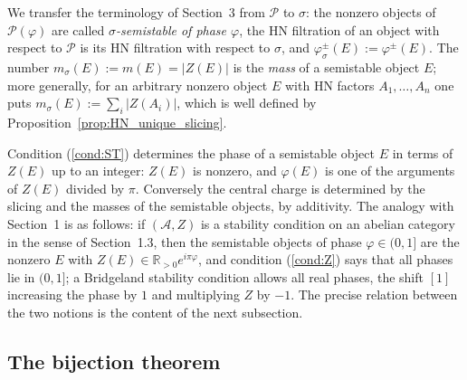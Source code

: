 \documentclass[12pt]{amsart}
\newcommand{\condref}[1]{\textup{(\ref{#1})}}
\numberwithin{theorem}{section}
\theoremstyle{definition}
\newcommand{\RR}{\mathbb{R}}
\newcommand{\calA}{\mathcal{A}}
\newcommand{\calP}{\mathcal{P}}
\begin{document}
	We transfer the terminology of Section~3 from $\calP$ to $\sigma$:
	the nonzero objects of $\calP(\varphi)$ are called \emph{$\sigma$-semistable of phase $\varphi$}, the HN filtration of an object with respect to $\calP$ is its HN filtration with respect to $\sigma$, and $\varphi^{\pm}_{\sigma}(E) := \varphi^{\pm}(E)$.
	The number $m_{\sigma}(E) := m(E) = |Z(E)|$ is the \emph{mass} of a semistable object $E$; more generally, for an arbitrary nonzero object $E$ with HN factors $A_1, \ldots, A_n$ one puts $m_{\sigma}(E) := \sum_i |Z(A_i)|$, which is well defined by Proposition~\ref{prop:HN_unique_slicing}.

	Condition \condref{cond:ST} determines the phase of a semistable object $E$ in terms of $Z(E)$ up to an integer:
	$Z(E)$ is nonzero, and $\varphi(E)$ is one of the arguments of $Z(E)$ divided by $\pi$.
	Conversely the central charge is determined by the slicing and the masses of the semistable objects, by additivity.
	The analogy with Section~1 is as follows: if $(\calA, Z)$ is a stability condition on an abelian category in the sense of Section~1.3, then the semistable objects of phase $\varphi \in (0, 1]$ are the nonzero $E$ with $Z(E) \in \RR_{>0} e^{i \pi \varphi}$, and condition \condref{cond:Z} says that all phases lie in $(0, 1]$;
	a Bridgeland stability condition allows all real phases, the shift $[1]$ increasing the phase by $1$ and multiplying $Z$ by $-1$.
	The precise relation between the two notions is the content of the next subsection.

	\subsection{The bijection theorem}
\end{document}
